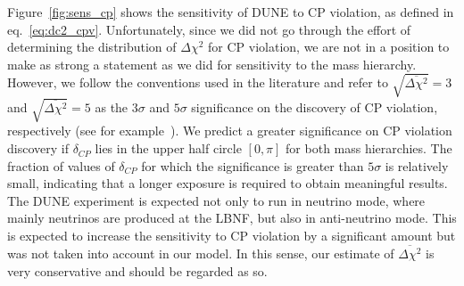 Figure~\ref{fig:sens_cp} shows the sensitivity of DUNE to CP violation, as
defined in eq.~\ref{eq:dc2_cpv}. Unfortunately, since we did not go through the effort of
determining the distribution of $\Delta\chi^2$ for CP violation, we are not in
a position to make as strong a statement as we did for sensitivity to the mass hierarchy.
However, we follow the conventions used in the literature and refer to
$\sqrt{\overline{\Delta\chi^2}}=3$ and $\sqrt{\overline{\Delta\chi^2}}=5$ as
the $3\sigma$ and $5\sigma$ significance on the discovery of CP violation,
respectively (see
for example~\cite{ballett, martin-albo, laguna-lbno, masud}). We predict a greater
significance on CP violation discovery if $\delta_{CP}$ lies in the upper half circle
$[0, \pi]$ for both mass hierarchies. The fraction of values of $\delta_{CP}$
for which the significance is greater than $5\sigma$ is relatively small,
indicating that a longer exposure is required to obtain meaningful results.
The DUNE experiment is expected not only to run in neutrino mode, where mainly
neutrinos are produced at the LBNF, but also in anti-neutrino mode. This
is expected to increase the sensitivity to CP violation by a significant amount
but was not taken into account in our model. In this sense, our estimate of
$\overline{\Delta\chi^2}$ is very conservative and should be regarded as so.







